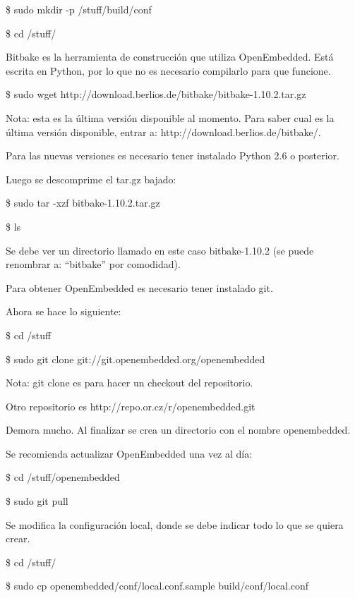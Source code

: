 \bigskip
\centerline{\$ sudo mkdir -p /stuff/build/conf}

\centerline{\$ cd /stuff/}

\bigskip
Bitbake es la herramienta de construcción que utiliza OpenEmbedded. Está escrita en Python, por lo que no es necesario compilarlo para que funcione.

\bigskip
\centerline{\$ sudo wget http://download.berlios.de/bitbake/bitbake-1.10.2.tar.gz}

\bigskip
Nota: esta es la última versión disponible al momento. Para saber cual es la última versión disponible, entrar a: http://download.berlios.de/bitbake/.

Para las nuevas versiones es necesario tener instalado Python 2.6 o posterior.

\newpage
Luego se descomprime el tar.gz bajado:

\bigskip
\centerline{\$ sudo tar -xzf bitbake-1.10.2.tar.gz}

\centerline{\$ ls}

\bigskip
Se debe ver un directorio llamado en este caso bitbake-1.10.2 (se puede renombrar a: “bitbake” por comodidad).

\bigskip
Para obtener OpenEmbedded es necesario tener instalado git.

\bigskip
Ahora se hace lo siguiente:

\bigskip
\centerline{\$ cd /stuff}

\centerline{\$ sudo git clone git://git.openembedded.org/openembedded}

\bigskip
Nota: git clone es para hacer un checkout del repositorio. 

Otro repositorio es http://repo.or.cz/r/openembedded.git

\bigskip
Demora mucho. Al finalizar se crea un directorio con el nombre openembedded.

\bigskip
Se recomienda actualizar OpenEmbedded una vez al día:

\bigskip
\centerline{\$ cd /stuff/openembedded}

\centerline{\$ sudo git pull}

\bigskip
{}

\bigskip
Se modifica la configuración local, donde se debe indicar todo lo que se quiera crear.

\bigskip
\centerline{\$ cd /stuff/}

\centerline{\$ sudo cp openembedded/conf/local.conf.sample build/conf/local.conf}


